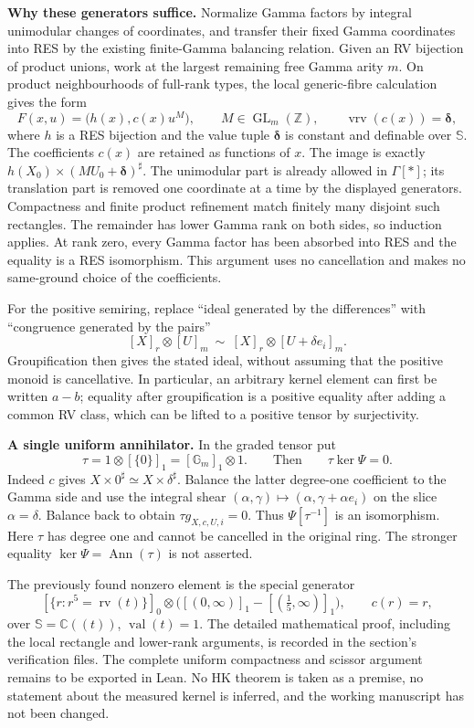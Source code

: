 \documentclass[12pt]{amsart}
\theoremstyle{plain}
\theoremstyle{definition}
\theoremstyle{remark}
\numberwithin{equation}{section}
\theoremstyle{plain}
\newcommand{\0}{\emptyset}
\DeclareMathOperator{\rv}{rv}
\DeclareMathOperator{\vv}{val}
\DeclareMathOperator{\vrv}{vrv}
\begin{document}
\smallskip
\noindent\textbf{Why these generators suffice.}
Normalize Gamma factors by integral unimodular changes of coordinates,
and transfer their fixed Gamma coordinates into RES by the existing
finite-Gamma balancing relation. Given an RV bijection of product
unions, work at the largest remaining free Gamma arity $m$. On product
neighbourhoods of full-rank types, the local generic-fibre calculation
gives the form
\[
 F(x,u)=\bigl(h(x),c(x)u^M\bigr),\qquad
 M\in\operatorname{GL}_m(\mathbb Z),\qquad
 \vrv(c(x))=\boldsymbol\delta,
\]
where $h$ is a RES bijection and the value tuple
$\boldsymbol\delta$ is constant and definable over $\mathbb S$.
The coefficients $c(x)$ are retained as functions of $x$.
The image is exactly
$h(X_0)\times(MU_0+\boldsymbol\delta)^\sharp$.
The unimodular part is already allowed in $\Gamma[*]$; its translation
part is removed one coordinate at a time by the displayed generators.
Compactness and finite product refinement match finitely many disjoint
such rectangles. The remainder has lower Gamma rank on both sides, so
induction applies. At rank zero, every Gamma factor has been absorbed
into RES and the equality is a RES isomorphism. This argument uses no
cancellation and makes no same-ground choice of the coefficients.

\smallskip
For the positive semiring, replace ``ideal generated by the differences''
with ``congruence generated by the pairs''
\[
 [X]_r\otimes[U]_m\ \sim\
 [X]_r\otimes[U+\delta e_i]_m.
\]
Groupification then gives the stated ideal, without assuming that the
positive monoid is cancellative. In particular, an arbitrary kernel
element can first be written $a-b$; equality after groupification is a
positive equality after adding a common RV class, which can be lifted
to a positive tensor by surjectivity.

\smallskip
\noindent\textbf{A single uniform annihilator.}
In the graded tensor put
\[
 \tau=1\otimes[\{0\}]_1=[\mathbb G_m]_1\otimes1.
 \qquad\text{Then}\qquad \tau\ker\Psi=0.
\]
Indeed $c$ gives $X\times0^\sharp\simeq X\times\delta^\sharp$.
Balance the latter degree-one coefficient to the Gamma side and use the
integral shear
$(\alpha,\gamma)\mapsto(\alpha,\gamma+\alpha e_i)$ on the slice
$\alpha=\delta$. Balance back to obtain
$\tau g_{X,c,U,i}=0$. Thus $\Psi[\tau^{-1}]$ is an isomorphism.
Here $\tau$ has degree one and cannot be cancelled in the original
ring. The stronger equality $\ker\Psi=\operatorname{Ann}(\tau)$ is
not asserted.

\smallskip
The previously found nonzero element is the special generator
\[
 [\{r:r^5=\rv(t)\}]_0\otimes
 \bigl([(0,\infty)]_1-[(\tfrac15,\infty)]_1\bigr),
 \qquad c(r)=r,
\]
over $\mathbb S=\mathbb C((t))$, $\vv(t)=1$.
The detailed mathematical proof, including the local rectangle and
lower-rank arguments, is recorded in the section's verification files.
The complete uniform compactness and scissor argument remains to be
exported in Lean. No HK theorem is taken as a premise, no statement
about the measured kernel is inferred, and the working manuscript has
not been changed.
\par\endgroup
\end{document}
